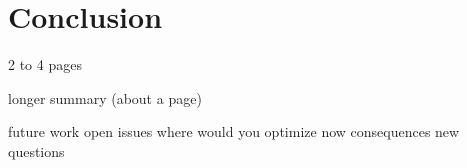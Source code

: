 \chapter{Conclusion}

2 to 4 pages

longer summary (about a page)

future work
open issues
where would you optimize now
consequences
new questions